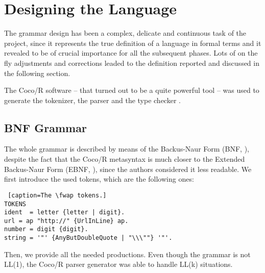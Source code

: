 \chapter{\label{chapter2} Designing the Language}

The grammar design has been a complex, delicate and continuous task of the project, since it represents the true definition of a language in formal terms and it revealed to be of crucial importance for all the subsequent phases. Lots of on the fly adjustments and corrections leaded to the definition reported and discussed in the following section. 

The Coco/R software -- that turned out to be a quite powerful tool -- was used to generate the tokenizer, the parser and the type checker \cite{cocor}.

\section{BNF Grammar}

The whole grammar is described by means of the Backus-Naur Form (BNF, \cite{bnf}), despite the fact that the Coco/R metasyntax is much closer to the Extended Backus-Naur Form (EBNF, \cite{ebnf}), since the authors considered it less readable.  We first introduce the used tokens, which are the following ones:\\

\begin{lstlisting} [caption=The \fwap tokens.]
TOKENS
ident  = letter {letter | digit}.
url = ap "http://" {UrlInLine} ap.
number = digit {digit}.
string = '"' {AnyButDoubleQuote | "\\\""} '"'.
\end{lstlisting}

Then, we provide all the needed productions. Even though the grammar is not LL(1), the Coco/R parser generator was able to handle LL(k) situations.

